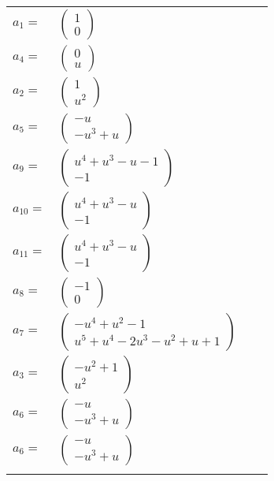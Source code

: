 \documentclass[1p]{elsarticle_modified}
\theoremstyle{definition}
\begin{document}
\begin{tabular}{m{7pt} m{180pt} m{7pt} m{180pt} }
\flushright $a_{1}=$&$\begin{pmatrix}1\\0\end{pmatrix}$ \\
\flushright $a_{4}=$&$\begin{pmatrix}0\\u\end{pmatrix}$ \\
\flushright $a_{2}=$&$\begin{pmatrix}1\\u^2\end{pmatrix}$ \\
\flushright $a_{5}=$&$\begin{pmatrix}- u\\- u^3+u\end{pmatrix}$ \\
\flushright $a_{9}=$&$\begin{pmatrix}u^4+u^3- u-1\\-1\end{pmatrix}$ \\
\flushright $a_{10}=$&$\begin{pmatrix}u^4+u^3- u\\-1\end{pmatrix}$ \\
\flushright $a_{11}=$&$\begin{pmatrix}u^4+u^3- u\\-1\end{pmatrix}$ \\
\flushright $a_{8}=$&$\begin{pmatrix}-1\\0\end{pmatrix}$ \\
\flushright $a_{7}=$&$\begin{pmatrix}- u^4+u^2-1\\u^5+u^4-2 u^3- u^2+u+1\end{pmatrix}$ \\
\flushright $a_{3}=$&$\begin{pmatrix}- u^2+1\\u^2\end{pmatrix}$ \\
\flushright $a_{6}=$&$\begin{pmatrix}- u\\- u^3+u\end{pmatrix}$\\ \flushright $a_{6}=$&$\begin{pmatrix}- u\\- u^3+u\end{pmatrix}$\\&\end{tabular}
\end{document}
